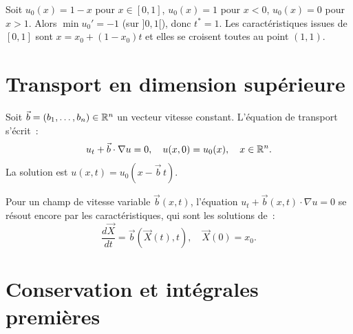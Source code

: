 \begin{center}
\end{center}

\begin{exemple}
Soit $u_0(x) = 1 - x$ pour $x \in [0,1]$, $u_0(x) = 1$ pour $x < 0$,
$u_0(x) = 0$ pour $x > 1$. Alors $\min u_0' = -1$ (sur $]0,1[$), donc
$t^* = 1$. Les caract\'eristiques issues de $[0,1]$ sont
$x = x_0 + (1-x_0)t$ et elles se croisent toutes au point $(1,1)$.
\end{exemple}

\section{Transport en dimension sup\'erieure}

\begin{definition}
Soit $\vec{b} = (b_1, \ldots, b_n) \in \mathbb{R}^n$ un vecteur vitesse constant.
L'\'equation de transport s'\'ecrit~:
\begin{equation}\label{eq:transport_Rn}
    u_t + \vec{b} \cdot \nabla u = 0, \quad u(x,0) = u_0(x),
    \quad x \in \mathbb{R}^n.
\end{equation}
La solution est $u(x,t) = u_0(x - \vec{b}\, t)$.
\end{definition}

Pour un champ de vitesse variable $\vec{b}(x,t)$, l'\'equation
$u_t + \vec{b}(x,t) \cdot \nabla u = 0$ se r\'esout encore par les
caract\'eristiques, qui sont les solutions de~:
\[
    \frac{d\vec{X}}{dt} = \vec{b}(\vec{X}(t), t), \quad \vec{X}(0) = x_0.
\]

\section{Conservation et int\'egrales premi\`eres}

